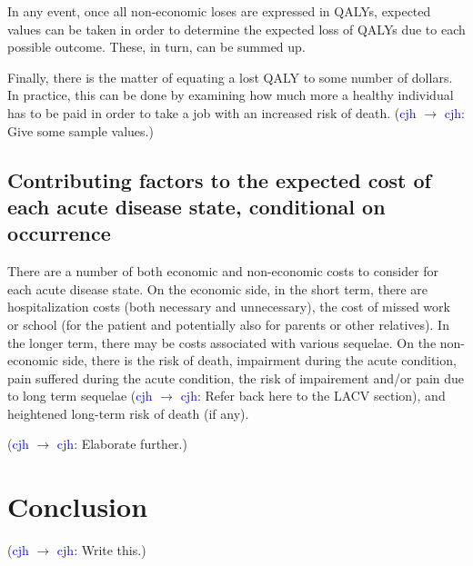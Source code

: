\documentclass{article}
\newcommand{\cjh}{\textcolor{blue}{cjh}}
\newcommand{\msg}[3]{(#1 $\rightarrow$ #2: #3)}
\newcommand{\mcc}[1]{\msg\cjh\cjh{#1}}
\begin{document}
            In any event, once all non-economic loses are expressed in QALYs, expected values can be taken in order to determine the expected loss of QALYs due to each possible outcome. These, in turn, can be summed up.

            Finally, there is the matter of equating a lost QALY to some number of dollars. In practice, this can be done by examining how much more a healthy individual has to be paid in order to take a job with an increased risk of death. \mcc{Give some sample values.}

        \subsection{Contributing factors to the expected cost of each acute disease state, conditional on occurrence}
            There are a number of both economic and non-economic costs to consider for each acute disease state. On the economic side, in the short term, there are hospitalization costs (both necessary and unnecessary), the cost of missed work or school (for the patient and potentially also for parents or other relatives). In the longer term, there may be costs associated with various sequelae. On the non-economic side, there is the risk of death, impairment during the acute condition, pain suffered during the acute condition, the risk of impairement and/or pain due to long term sequelae \mcc{Refer back here to the LACV section}, and heightened long-term risk of death (if any).

            \mcc{Elaborate further.}

    \section{Conclusion}
        \mcc{Write this.}
\end{document}
